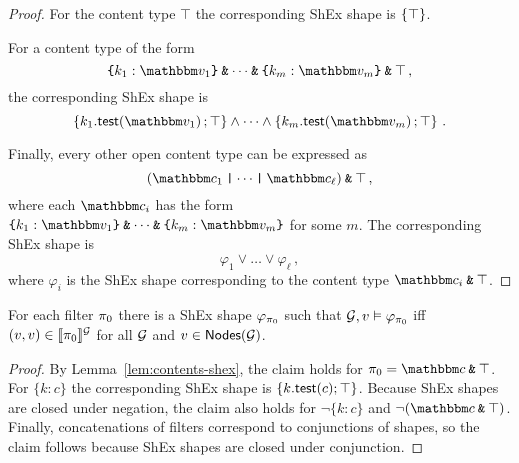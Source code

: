 \begin{proof}
For the content type $\top$ the corresponding ShEx shape is $\left\{ \top \right\}$.


For a content type of the form \[\closedRT{k_1:\vtype_1}\tAnd \dots \tAnd \closedRT{k_m :\vtype_m}\tAnd \top\,,\] 
the corresponding ShEx shape is \[\shexneigh{k_1. \test(\vtype_1)\shexeach \shexallte} \land  \dots \land \shexneigh{k_m.\test(\vtype_m)\shexeach \shexallte}\,.\] 

Finally, every other  open content type can be expressed as 
\[(\ntype_1 \tOr \dots \tOr \ntype_\ell)\tAnd \top\,,\]
where each $\ntype_i$ has the form $\closedRT{k_1:\vtype_1}\tAnd \dots \tAnd \closedRT{k_m :\vtype_m}$ for some $m$.
The corresponding ShEx shape is 
\[\varphi_1 \lor \dots \lor \varphi_\ell\,,\]
where $\varphi_i$ is the ShEx shape corresponding to the content type $\ntype_i \tAnd \top$.
\end{proof}

\begin{lemma}
\label{lem:filter-shex} For each filter $\pi_0$ there is a ShEx shape $\varphi_{\pi_0}$ such that  $\mathcal{G}, v\vDash \varphi_{\pi_0}$ iff $(v,v) \in \llbracket{\pi_0}\rrbracket^{\mathcal{G}}$ for all  $\mathcal{G}$ and $v\in\mathsf{Nodes}(\mathcal{G})$. 
\end{lemma}

\begin{proof} By Lemma~\ref{lem:contents-shex}, the claim holds for $\pi_0=\ntype\tAnd \top$. 
For $\{k:c\}$ the corresponding ShEx shape is $\left\{ k.\mathsf{test}(c);\top \right\}$. Because ShEx shapes are closed under negation, the claim also holds for $\lnot\{k:c\}$ and $\lnot(\ntype\tAnd \top)$.  Finally, concatenations of filters correspond to conjunctions of shapes, so the claim follows because ShEx shapes are closed under conjunction. 
\end{proof}

